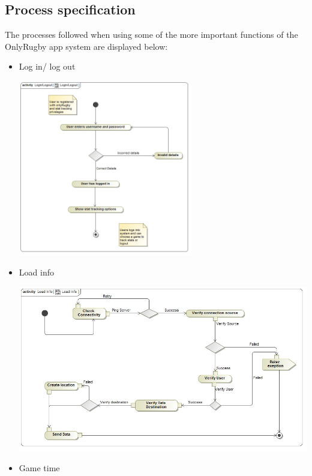 \documentclass[a4paper,12pt]{report}
\begin{document}
\subsection{Process specification}
The processes followed when using some of the more important functions of the OnlyRugby app system are displayed below:
\begin{itemize}
	\item Log in/ log out
		\begin{center}
  	 	\includegraphics[width=0.6\textwidth] {./Diagrams/Login_LogoutActivityDiagram.jpg}\\[0.4cm]    
		\end{center}
	\item Load info
		\begin{center}
  	 	\includegraphics[width=1\textwidth] {./Diagrams/LoadInfoActivityDiagram.jpg}\\[0.4cm]    
		\end{center}
	\item Game time
		\begin{center}

\end{center}
\end{itemize}
\end{document}
